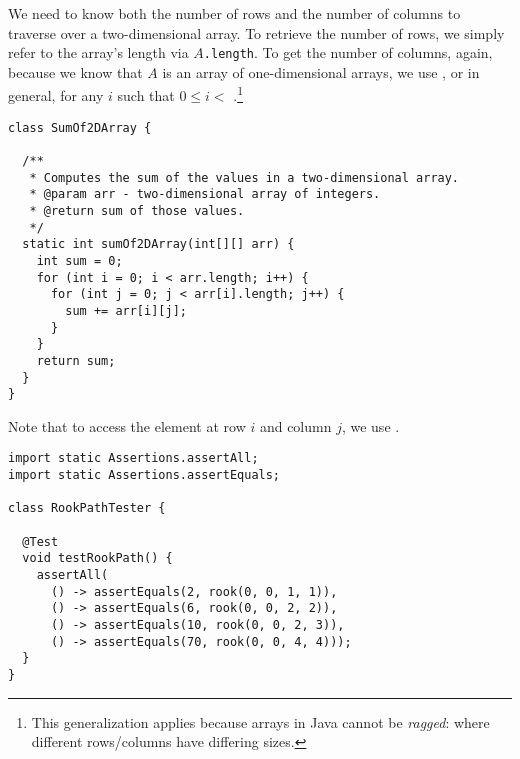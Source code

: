 We need to know both the number of rows and the number of columns to traverse over a two-dimensional array. To retrieve the number of rows, we simply refer to the array's length via \texttt{$A$.length}. To get the number of columns, again, because we know that $A$ is an array of one-dimensional arrays, we use , or in general,  for any $i$ such that $0 \leq i< $ .\footnote{This generalization applies because arrays in Java cannot be \emph{ragged}: where different rows/columns have differing sizes.}

\begin{lstlisting}[language=MyJava]
class SumOf2DArray {

  /**
   * Computes the sum of the values in a two-dimensional array.
   * @param arr - two-dimensional array of integers.
   * @return sum of those values.
   */
  static int sumOf2DArray(int[][] arr) {
    int sum = 0;
    for (int i = 0; i < arr.length; i++) {
      for (int j = 0; j < arr[i].length; j++) {
        sum += arr[i][j];
      }
    }
    return sum;
  }
}
\end{lstlisting}

Note that to access the element at row $i$ and column $j$, we use . 


\begin{lstlisting}[language=MyJava]
import static Assertions.assertAll;
import static Assertions.assertEquals;

class RookPathTester {

  @Test
  void testRookPath() {
    assertAll(
      () -> assertEquals(2, rook(0, 0, 1, 1)),
      () -> assertEquals(6, rook(0, 0, 2, 2)),
      () -> assertEquals(10, rook(0, 0, 2, 3)),
      () -> assertEquals(70, rook(0, 0, 4, 4)));
  }
}
\end{lstlisting}

